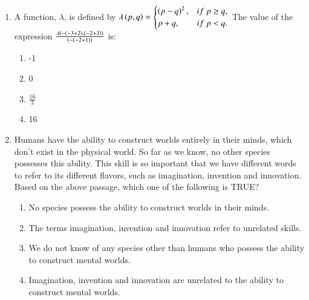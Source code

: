 \documentclass[journal,12pt,onecolumn]{IEEEtran}
\begin{document}
\begin{enumerate}
    \item A function, $\lambda$, is defined by $\lambda\left(p,q\right)=\begin{cases}\left(p-q\right)^{2},&if~p\ge q,\\ p+q,&if~p<q.\end{cases}$ The value of the expression $\frac{\lambda\left(-\left(-3+2\right),\left(-2+3\right)\right)}{\left(-\left(-2+1\right)\right)}$ is:
    \begin{multicols}{2}
    \begin{enumerate}
        \item -1
        \item 0
        \item $\frac{16}{3}$
        \item 16
    \end{enumerate}
    \end{multicols}
    \hfill{}

    \item Humans have the ability to construct worlds entirely in their minds, which don't exist in the physical world. So far as we know, no other species possesses this ability. This skill is so important that we have different words to refer to its different flavors, such as imagination, invention and innovation. Based on the above passage, which one of the following is TRUE?
    
    \begin{enumerate}
        \item No species possess the ability to construct worlds in their minds.
        \item The terms imagination, invention and innovation refer to unrelated skills.
        \item We do not know of any species other than humans who possess the ability to construct mental worlds.
        \item Imagination, invention and innovation are unrelated to the ability to construct mental worlds.
    \end{enumerate}
    
    \hfill{}

\end{enumerate}
\end{document}
